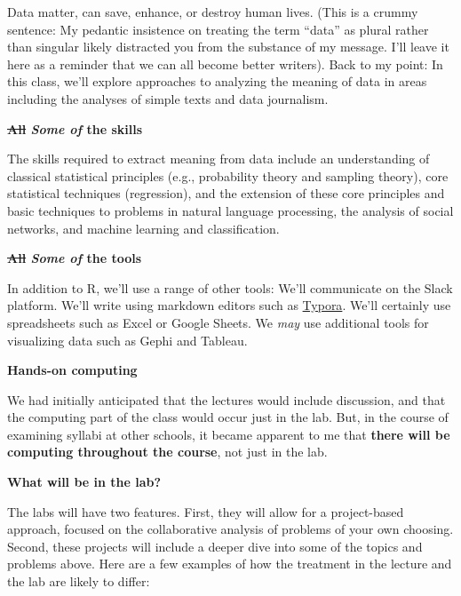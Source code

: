 \documentclass[]{book}
\theoremstyle{definition}
\theoremstyle{definition}
\theoremstyle{definition}
\theoremstyle{remark}
\begin{document}
Data matter, can save, enhance, or destroy human lives. (This is a
crummy sentence: My pedantic insistence on treating the term ``data'' as
plural rather than singular likely distracted you from the substance of
my message. I'll leave it here as a reminder that we can all become
better writers). Back to my point: In this class, we'll explore
approaches to analyzing the meaning of data in areas including the
analyses of simple texts and data journalism.

\textbf{\sout{All} \emph{Some of} the skills}

The skills required to extract meaning from data include an
understanding of classical statistical principles (e.g., probability
theory and sampling theory), core statistical techniques (regression),
and the extension of these core principles and basic techniques to
problems in natural language processing, the analysis of social
networks, and machine learning and classification.

\textbf{\sout{All} \emph{Some of} the tools}

In addition to R, we'll use a range of other tools: We'll communicate on
the Slack platform. We'll write using markdown editors such as
\href{https://typora.io/}{Typora}. We'll certainly use spreadsheets such
as Excel or Google Sheets. We \emph{may} use additional tools for
visualizing data such as Gephi and Tableau.

\textbf{Hands-on computing}

We had initially anticipated that the lectures would include discussion,
and that the computing part of the class would occur just in the lab.
But, in the course of examining syllabi at other schools, it became
apparent to me that \textbf{there will be computing throughout the
course}, not just in the lab.

\textbf{What will be in the lab?}

The labs will have two features. First, they will allow for a
project-based approach, focused on the collaborative analysis of
problems of your own choosing. Second, these projects will include a
deeper dive into some of the topics and problems above. Here are a few
examples of how the treatment in the lecture and the lab are likely to
differ:
\end{document}
